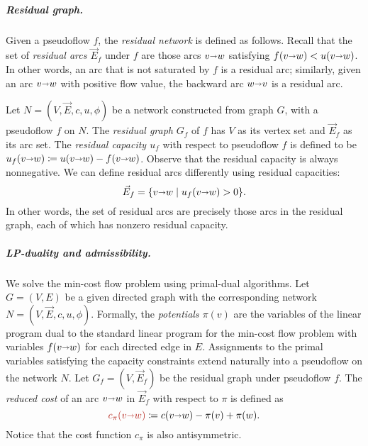 \documentclass[a4paper,UKenglish]{socg-lipics-v2018}
\makeatletter
\def\fsupply{\phi}
\def\arcto{\mathord\shortrightarrow}
\def\arc#1#2{#1\arcto#2}
\theoremstyle{plain}
\numberwithin{figure}{section}
\renewcommand{\paragraph}{\subparagraph}
\def\EMPH#1{\textcolor{BrickRed}{{\emph{#1}}}}
\def\n@te#1{\textsf{\boldmath \textbf{$\langle\!\langle$#1$\rangle\!\rangle$}}\leavevmode}
\def\note#1{\textcolor{red}{\n@te{#1}}}
\makeatother
\begin{document}
\begin{toappendix}
\paragraph{Residual graph.}
Given a pseudoflow $f$, the \emph{residual network} is defined as follows.
%
Recall that the set of \emph{residual arcs $\vec{E}_f$} under $f$ are those arcs $\arc vw$ satisfying $f(\arc vw) < u(\arc vw)$.  In other words, an arc that is not saturated by $f$ is a residual arc; similarly, given an arc $\arc vw$ with positive flow value, the backward arc $\arc wv$ is a residual arc.

Let $N = (V,\vec{E},c,u,\fsupply)$ be a network constructed from graph $G$, with a pseudoflow $f$ on $N$.
The \EMPH{residual graph} $G_f$ of $f$ has $V$ as its vertex set and $\vec{E}_f$ as its arc set.
%
The \EMPH{residual capacity $u_f$} with respect to
pseudoflow $f$ is defined to be $u_f(\arc vw) \coloneqq u(\arc vw) - f(\arc vw)$.
Observe that the residual capacity is always nonnegative.
We can define residual arcs differently using residual capacities:
\[
\vec{E}_f = \{\arc vw \mid u_f(\arc vw) > 0\}.
\]
In other words, the set of residual arcs are precisely those arcs in the residual graph, each of which has nonzero residual capacity.
%
%
%

\end{toappendix}

\paragraph{LP-duality and admissibility.}
We solve the min-cost flow problem using primal-dual algorithms.
Let $G = (V,E)$ be a given directed graph with the corresponding network $N = (V,\vec{E},c,u,\fsupply)$.
Formally, the
\EMPH{potentials $\pi(v)$} are the variables of the linear program dual to the standard linear program for the min-cost flow problem with variables $f(\arc{v}{w})$ for each directed edge in $E$.
Assignments to the primal variables satisfying the capacity constraints extend naturally into a pseudoflow on the network $N$.
Let $G_f = (V,\vec{E}_f)$ be the residual graph under pseudoflow $f$.
The \EMPH{reduced cost} of an arc $\arc vw$ in $\vec{E}_f$ with respect to $\pi$ is defined as
\[
\EMPH{$c_\pi(\arc vw)$} \coloneqq c(\arc vw) - \pi(v) + \pi(w).
\]
Notice that the cost function $c_\pi$ is also antisymmetric.
\end{document}

